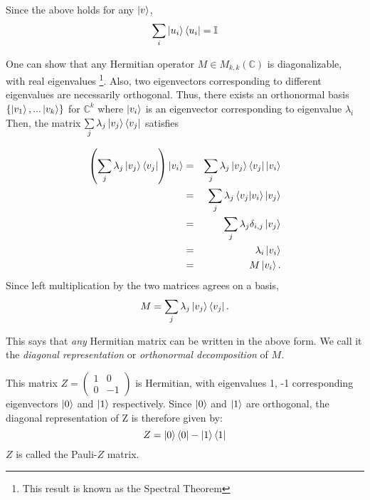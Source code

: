 Since the above holds for any $\ket{v}$, 
\begin{equation} \label{eqn: orthonormal basis satisfies completion relation}
    \sum\limits_i \ket{u_i}\bra{u_i}=\mathbb{I}
\end{equation}

One can show that any Hermitian operator $M \in M_{k,k}(\mathbb{C})$ is diagonalizable, with real eigenvalues \footnote{This result is known as the Spectral Theorem}.  Also, two eigenvectors corresponding to different eigenvalues are necessarily orthogonal.  Thus, there exists an orthonormal basis $\{\ket{v_1},...\ket{v_k}\}$ for $\mathbb{C}^k$ where $\ket{v_i}$ is an eigenvector corresponding to eigenvalue $\lambda_i$  Then, the matrix $\sum\limits_j \lambda_j \ket{v_j}\bra{v_j}$ satisfies

\begin{eqnarray}
\left(\sum\limits_j \lambda_j\ket{v_j}\bra{v_j}\right)\ket{v_i}&=&\sum\limits_j \lambda_j\ket{v_j}\bra{v_j}\ket{v_i}\\
&=&\sum\limits_j \lambda_j\braket{v_j|v_i}\ket{v_j}\\
&=&\sum\limits_j \lambda_j\delta_{i,j}\ket{v_j}\\
&=&\lambda_i\ket{v_i}\\
&=&M\ket{v_i}.
\end{eqnarray}
Since left multiplication by the two matrices agrees on a basis,
\begin{equation}
M=\sum\limits_j \lambda_j \ket{v_j}\bra{v_j}.    
\end{equation}

This says that {\emph{any}} Hermitian matrix can be written in the above form. We call it the \textit{diagonal representation} or \textit{orthonormal decomposition} of $M$.
\begin{example} \label{example-pauli z diagonal rep}
This matrix $Z=\left(\begin{smallmatrix}
    1 & 0\\
    0 & -1
    \end{smallmatrix}\right)$
    is Hermitian, with eigenvalues 1, -1 corresponding eigenvectors $\ket{0}$ and  $\ket{1}$ respectively.  Since $\ket{0}$ and $\ket{1}$ are orthogonal, the diagonal representation of Z is therefore given by:
\begin{equation}
    Z=\ket{0}\bra{0}-\ket{1}\bra{1}
\end{equation}
$Z$ is called the Pauli-$Z$ matrix.
\end{example}

